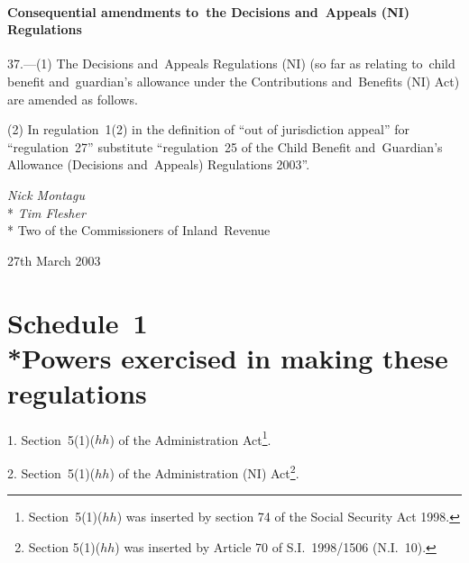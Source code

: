 \documentclass[12pt,a4paper]{article}
\begin{document}
\subsection[37. Consequential amendments to~the Decisions and~Appeals (NI) Regulations]{Consequential amendments to~the Decisions and~Appeals (NI) Regulations}

37.---(1)  The Decisions and~Appeals Regulations (NI) (so far as relating to~child benefit and~guardian’s allowance under the Contributions and~Benefits (NI) Act) are amended as follows.

(2) In regulation~1(2) in the definition of “out of jurisdiction appeal” for “regulation~27” substitute “regulation~25 of the Child Benefit and~Guardian’s Allowance (Decisions and~Appeals) Regulations 2003”. 

\bigskip


{\raggedleft
\emph{Nick Montagu}\\*
\emph{Tim Flesher}\\*
Two of the Commissioners of Inland~Revenue

}

27th March 2003


\small

\part[Schedule~1 --- Powers exercised in making these regulations]{Schedule~1\\*Powers exercised in making these regulations}

\renewcommand\parthead{--- Schedule~1}

1.  Section~5(1)($hh$)  of the Administration Act\footnote{Section~5(1)($hh$) was inserted by section 74 of the Social Security Act 1998.}.

\medskip

2.  Section~5(1)($hh$)  of the Administration (NI) Act\footnote{Section 5(1)($hh$) was inserted by Article 70 of S.I.~1998/1506 (N.I.~10).}.

\medskip
\end{document}
